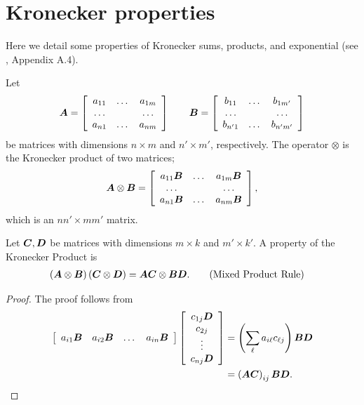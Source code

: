 \chapter{Kronecker properties}\label{appendix: kronecker}
Here we detail some properties of Kronecker sums, products, and exponential (see \citep{MEinAP}, Appendix A.4). 

Let 
\[\boldsymbol A = \left[\begin{array}{ccc}a_{11} & \dots & a_{1m}\\\hdots & & \hdots \\ a_{n1}&\dots & a_{nm}\end{array}\right]
\qquad
\boldsymbol{B} = \left[\begin{array}{ccc}b_{11} & \dots & b_{1m'}\\\hdots & & \hdots \\ b_{n'1}&\dots & b_{n'm'}\end{array}\right]\]
be matrices with dimensions \(n\times m\) and \(n'\times m'\), respectively. The operator \(\otimes\) is the Kronecker product of two matrices; 
\[\boldsymbol A\otimes \boldsymbol{B} = \left[\begin{array}{ccc}a_{11}\boldsymbol{B} & \dots & a_{1m}\boldsymbol{B}\\\hdots & & \hdots \\ a_{n1}\boldsymbol{B}&\dots & a_{nm}\boldsymbol{B}\end{array}\right],\]
which is an \(nn'\times mm'\) matrix. 

Let \(\boldsymbol{C},\boldsymbol{D}\)  be matrices with dimensions \(m\times k\) and \(m'\times k'\). A property of the Kronecker Product is 
\begin{align}
	\left(\boldsymbol A\otimes \boldsymbol{B}\right)\left(\boldsymbol{C}\otimes \boldsymbol{D}\right) &= \boldsymbol A\boldsymbol{C}\otimes \boldsymbol{B}\boldsymbol{D}.\label{eqn:mpr}\tag{Mixed Product Rule}
\end{align}
\begin{proof}
	The proof follows from 
	\begin{align*}
		\left[\begin{array}{cccc}a_{i1}\boldsymbol{B} & a_{i2}\boldsymbol{B}&\dots&a_{in}\boldsymbol{B}\end{array}\right]\left[\begin{array}{c}c_{1j}\boldsymbol{D}\\c_{2j}\\\vdots\\c_{nj}\boldsymbol{D} \end{array}\right] 
		&= \left(\sum_\ell a_{i\ell}c_{\ell j}\right) \boldsymbol{B}\boldsymbol{D}
		\\&= \left(\boldsymbol A\boldsymbol{C}\right)_{ij}\boldsymbol{B}\boldsymbol{D}.
	\end{align*}
\end{proof}

